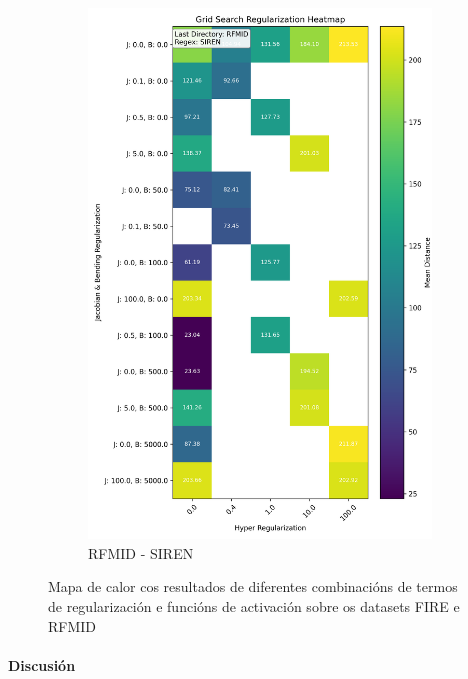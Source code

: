 \begin{figure}[ht]
\begin{subfigure}[b]{0.45\textwidth}
        \includegraphics[width=\textwidth]{imaxes/grid_search_single_heatmap_RFMID_SIREN.png}
        \caption{RFMID - SIREN}
        \label{fig:gs_single_RFMID_SIREN}
    \end{subfigure}
    
    \caption{Mapa de calor cos resultados de diferentes combinacións de termos de regularización e funcións de activación sobre os datasets FIRE e RFMID}
    \label{fig:gs_single_heatmaps}
\end{figure}

\paragraph{Discusión}
\label{par:Discusión}


